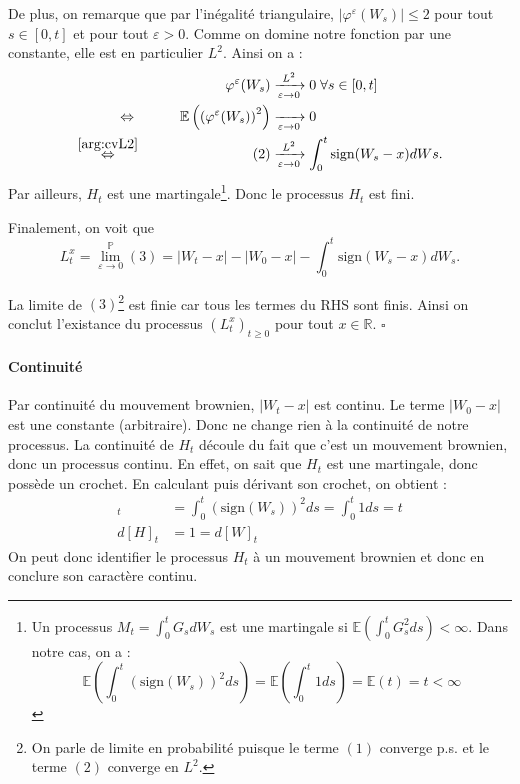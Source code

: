 \documentclass[openany]{book}
\makeatletter
\renewcommand{\P}{\mathds{P}}
\newcommand{\R}{\mathbb{R}}
\newcommand{\E}{\mathbb{E}}
\newcommand{\1}{\mathbbm{1}}
\newcommand{\sign}{\text{sign}}
\renewenvironment{proof}[1][\textbf{\textit{Démonstration}}]{%
  \par\pushQED{\qed}%
  \normalfont\topsep6\p@\@plus6\p@\relax
  \trivlist\item[\hskip\labelsep
    #1\@addpunct{.}]\ignorespaces
}{%
  \popQED\endtrivlist\@endpefalse
}
\theoremstyle{thmfont}
\theoremstyle{deffont}
\theoremstyle{thmfont}
\theoremstyle{deffont}
\makeatother
\begin{document}
\begin{proof}
\noindent De plus, on remarque que par l'inégalité triangulaire,
$|\varphi^\varepsilon(W_s)| \leq 2$ pour tout $s \in[0,t]$ et pour tout $\varepsilon > 0$. Comme on domine notre fonction par une constante, elle est en particulier $L^2$. Ainsi on a :
\begin{alignat*}{2}
&& \varphi^\varepsilon(W_s) &\xrightarrow[\varepsilon \to 0]{L^2} 0 \; \forall s \in [0,t]\\
\Leftrightarrow\;&&\qquad \E\left(\left(\varphi^\varepsilon(W_s)\right)^2\right) &\xrightarrow[\varepsilon\to0]{} 0\\
\overset{\eqref{arg:cvL2}}{\Leftrightarrow}&&\qquad(2) &\xrightarrow[\varepsilon \to 0]{L^2} \int_0^t \sign(W_s -x) dWs.
\end{alignat*}
Par ailleurs, $H_t$ est une martingale\footnote{Un processus $M_t = \int_0^t G_s dW_s$ est une martingale si $\E(\int_0^t G_s^2 ds)<\infty$. Dans notre cas, on a : $$\E\left(\int_0^t\left(\sign(W_s)\right)^2 ds\right) = \E\left(\int_0^t1 ds\right) = \E(t) = t < \infty$$}. Donc le processus $H_t$ est fini.

\noindent Finalement, on voit que
\begin{equation}
  L_t^x = \lim_{\varepsilon \to 0}^{\P}(3) = |W_t-x| - |W_0 - x| -  \int_0^t\sign(W_s -x)dW_s.
  \label{eq:exprTempsLoc}
\end{equation}

\noindent La limite de $(3)$\footnote{On parle de limite en probabilité puisque le terme $(1)$ converge p.s. et le terme $(2)$ converge en $L^2$.} est finie car tous les termes du RHS sont finis. Ainsi on conclut l'existance du processus $(L_t^x)_{t\geq0}$ pour tout $x \in \R$. \hfill $\square$

\paragraph{Continuité} Par continuité du mouvement brownien, $|W_t - x|$ est continu. Le terme $|W_0 - x|$ est une constante (arbitraire). Donc ne change rien à la continuité de notre processus. La continuité de $H_t$ découle du fait que c'est un mouvement brownien, donc un processus continu. En effet, on sait que $H_t$ est une martingale, donc possède un crochet. En calculant puis dérivant son crochet, on obtient :
\begin{align*}
  [H]_t &= \int_0^t (\sign(W_s))^2 ds  = \int_0^t 1 ds = t\\
  d[H]_t &= 1 = d[W]_t
\end{align*}
On peut donc identifier le processus $H_t$ à un mouvement brownien et donc en conclure son caractère continu.  


\end{proof}
\end{document}
